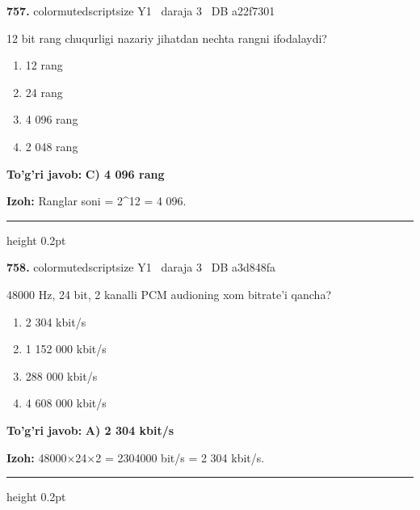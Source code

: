 \documentclass[10pt,a4paper,oneside]{article}
\begin{document}
\noindent\textbf{\color{ink}757.}  {color{muted}scriptsize Y1 \textbullet\ daraja 3 \textbullet\ DB a22f7301}
\par
12 bit rang chuqurligi nazariy jihatdan nechta rangni ifodalaydi?
\begin{enumerate}[label=\Alph*),leftmargin=9mm]
\item 12 rang
\item 24 rang
\item 4 096 rang
\item 2 048 rang
\end{enumerate}
\begin{tcolorbox}[enhanced,breakable,colback=teal!4,colframe=teal!50!black,boxrule=0.5pt,arc=1.1mm,left=3mm,right=3mm,top=1.7mm,bottom=1.7mm,before skip=2mm,after skip=2mm]
\textbf{\color{teal}To'g'ri javob:} \textbf{C) 4 096 rang}
\par\smallskip
\textbf{Izoh:} Ranglar soni = 2\textasciicircum{}12 = 4 096.
\end{tcolorbox}
\vspace{2mm}\hrule height 0.2pt \vspace{3mm}

\noindent\textbf{\color{ink}758.}  {color{muted}scriptsize Y1 \textbullet\ daraja 3 \textbullet\ DB a3d848fa}
\par
48000 Hz, 24 bit, 2 kanalli PCM audioning xom bitrate'i qancha?
\begin{enumerate}[label=\Alph*),leftmargin=9mm]
\item 2 304 kbit/s
\item 1 152 000 kbit/s
\item 288 000 kbit/s
\item 4 608 000 kbit/s
\end{enumerate}
\begin{tcolorbox}[enhanced,breakable,colback=teal!4,colframe=teal!50!black,boxrule=0.5pt,arc=1.1mm,left=3mm,right=3mm,top=1.7mm,bottom=1.7mm,before skip=2mm,after skip=2mm]
\textbf{\color{teal}To'g'ri javob:} \textbf{A) 2 304 kbit/s}
\par\smallskip
\textbf{Izoh:} 48000\ensuremath{\times}24\ensuremath{\times}2 = 2304000 bit/s = 2 304 kbit/s.
\end{tcolorbox}
\vspace{2mm}\hrule height 0.2pt \vspace{3mm}
\end{document}

